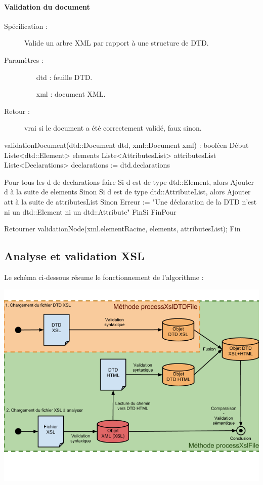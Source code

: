 \documentclass[10pt,a4paper]{article}
\begin{document}
\paragraph{Validation du document}
\begin{description}
\item[Spécification :] Valide un arbre XML par rapport à une structure de DTD.
\item[Paramètres :]
\begin{itemize}
\item[dtd] : feuille DTD.
\item[xml] : document XML.
\end{itemize}
\item[Retour :] vrai si le document a été correctement validé, faux sinon.
\end{description}

\begin{verbatimtab}
validationDocument(dtd::Document dtd, xml::Document xml) : booléen
Début
	Liste<dtd::Element> elements
	Liste<AttributesList> attributesList   
	Liste<Declarations> declarations := dtd.declarations
	
	Pour tous les d de declarations faire
		Si d est de type dtd::Element, alors
			Ajouter d à la suite de elements
		Sinon
       		Si d est de type dtd::AttributeList, alors
       			Ajouter att à la suite de attributesList
			Sinon
       			Erreur := "Une déclaration de la DTD n'est ni un dtd::Element 
       				ni un dtd::Attribute"
		FinSi
	FinPour
   
	Retourner validationNode(xml.elementRacine, elements, attributesList);
Fin
\end{verbatimtab}

\subsection{Analyse et validation XSL}
Le schéma ci-dessous résume le fonctionnement de l'algorithme :

\includegraphics[scale=0.65]{Algorithmes.png}
\end{document}
